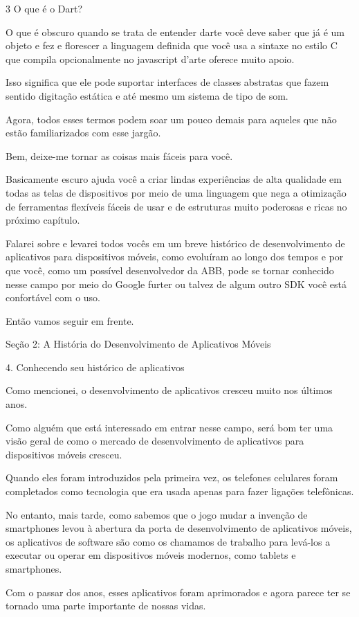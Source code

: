 3 O que é o Dart?

O que é obscuro quando se trata de entender darte você deve saber que já é um objeto e fez e florescer a linguagem definida que você usa a sintaxe no estilo C que compila opcionalmente no javascript d'arte oferece muito apoio.

Isso significa que ele pode suportar interfaces de classes abstratas que fazem sentido digitação estática e até mesmo um sistema de tipo de som.

Agora, todos esses termos podem soar um pouco demais para aqueles que não estão familiarizados com esse jargão.

Bem, deixe-me tornar as coisas mais fáceis para você.

Basicamente escuro ajuda você a criar lindas experiências de alta qualidade em todas as telas de dispositivos por meio de uma linguagem que nega a otimização de ferramentas flexíveis fáceis de usar e de estruturas muito poderosas e ricas no próximo capítulo.

Falarei sobre e levarei todos vocês em um breve histórico de desenvolvimento de aplicativos para dispositivos móveis, como evoluíram ao longo dos tempos e por que você, como um possível desenvolvedor da ABB, pode se tornar conhecido nesse campo por meio do Google furter ou talvez de algum outro SDK você está confortável com o uso.

Então vamos seguir em frente.


Seção 2: A História do Desenvolvimento de Aplicativos Móveis

4. Conhecendo seu histórico de aplicativos

Como mencionei, o desenvolvimento de aplicativos cresceu muito nos últimos anos.

Como alguém que está interessado em entrar nesse campo, será bom ter uma visão geral de como o mercado de desenvolvimento de aplicativos para dispositivos móveis cresceu.

Quando eles foram introduzidos pela primeira vez, os telefones celulares foram completados como tecnologia que era usada apenas para fazer ligações telefônicas.

No entanto, mais tarde, como sabemos que o jogo mudar a invenção de smartphones levou à abertura da porta de desenvolvimento de aplicativos móveis, os aplicativos de software são como os chamamos de trabalho para levá-los a executar ou operar em dispositivos móveis modernos, como tablets e smartphones.

Com o passar dos anos, esses aplicativos foram aprimorados e agora parece ter se tornado uma parte importante de nossas vidas.

